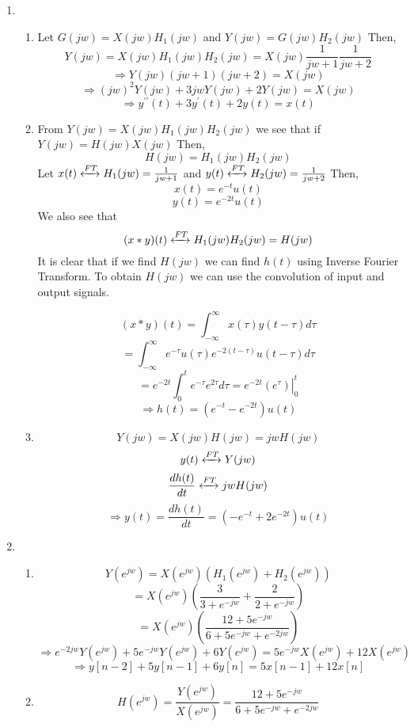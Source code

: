 \documentclass[10pt,a4paper, margin=1in]{article}
\begin{document}
\begin{enumerate}
\begin{enumerate}
    \end{enumerate}

\item %
	\begin{enumerate}
    \item %
Let \(G(jw) = X(jw)H_{1}(jw)  \) and \( Y(jw) = G(jw)H_{2}(jw) \)
Then,
\[Y(jw) = X(jw)H_{1}(jw)H_{2}(jw) = X(jw)\frac{1}{jw+1}\frac{1}{jw+2} \]
\[ \Rightarrow Y(jw)(jw+1)(jw+2) = X(jw) \]
\[ \Rightarrow (jw)^{2}Y(jw) + 3jwY(jw) + 2Y(jw) = X(jw) \]
\[\Rightarrow y^{\prime\prime}(t) + 3y^{\prime}(t) + 2y(t) = x(t)  \]

    \item %
From \( Y(jw) = X(jw)H_{1}(jw)H_{2}(jw) \)  we see that if   \( Y(jw) = H(jw)X(jw) \)
Then,
\[ H(jw) = H_{1}(jw)H_{2}(jw) \]
Let \(x(t) \xleftrightarrow{FT} H_{1}(jw) = \frac{1}{jw+1} \)  and   \( y(t) \xleftrightarrow{FT} H_{2}(jw) = \frac{1}{jw+2} \)
Then,
\[ x(t) = e^{-t}u(t) \]
\[ y(t) = e^{-2t}u(t) \]
We also see that
\[ (x \ast y)(t) \xleftrightarrow{FT} H_{1}(jw)H_{2}(jw) = H(jw) \]
It is clear that if we find \(H(jw)\) we can find \(h(t)\) using Inverse Fourier Transform. To obtain \(H(jw)\) we can use the convolution of input and output signals.

\[ (x \ast y)(t) = \int_{-\infty}^{\infty}x(\tau)y(t-\tau)d\tau \]
\[ = \int_{-\infty}^{\infty}e^{-\tau}u(\tau)e^{-2(t - \tau)}u(t-\tau)d\tau \]
\[ = e^{-2t}\int_{0}^{t}e^{-\tau}e^{2\tau}d\tau  = \left. e^{-2t}(e^{\tau}) \right|^{t}_{0}   \]
\[\Rightarrow h(t) = (e^{-t} - e^{-2t})u(t) \]

	\item %
\[ Y(jw) = X(jw)H(jw) = jwH(jw) \]
\[y(t) \xleftrightarrow{FT} Y(jw) \]
\[ \frac{dh(t)}{dt} \xleftrightarrow{FT} jwH(jw) \]
\[\Rightarrow y(t) = \frac{dh(t)}{dt} = (-e^{-t} + 2e^{-2t})u(t) \]

    \end{enumerate}

\item %
    \begin{enumerate}
    \item %
\[Y(e^{jw}) = X(e^{jw})(H_{1}(e^{jw}) + H_{2}(e^{jw}))   \]
\[ = X(e^{jw})(\frac{3}{3 + e^{-jw}} + \frac{2}{2 + e^{-jw}})  \]
\[ = X(e^{jw})(\frac{ 12 + 5e^{-jw} }{ 6 + 5e^{-jw} + e^{-2jw} })  \]
\[ \Rightarrow e^{-2jw}Y(e^{jw}) + 5e^{-jw}Y(e^{jw}) + 6Y(e^{jw}) = 5e^{-jw}X(e^{jw}) + 12X(e^{jw})  \]
\[ \Rightarrow y[n-2] + 5y[n-1] + 6y[n] = 5x[n-1] + 12x[n]  \]
    \item %
\[ H(e^{jw}) = \frac{ Y(e^{jw}) }{ X(e^{jw}) } = \frac{ 12 + 5e^{-jw} }{ 6 + 5e^{-jw} + e^{-2jw} }  \]


\end{enumerate}
\end{enumerate}
\end{document}
